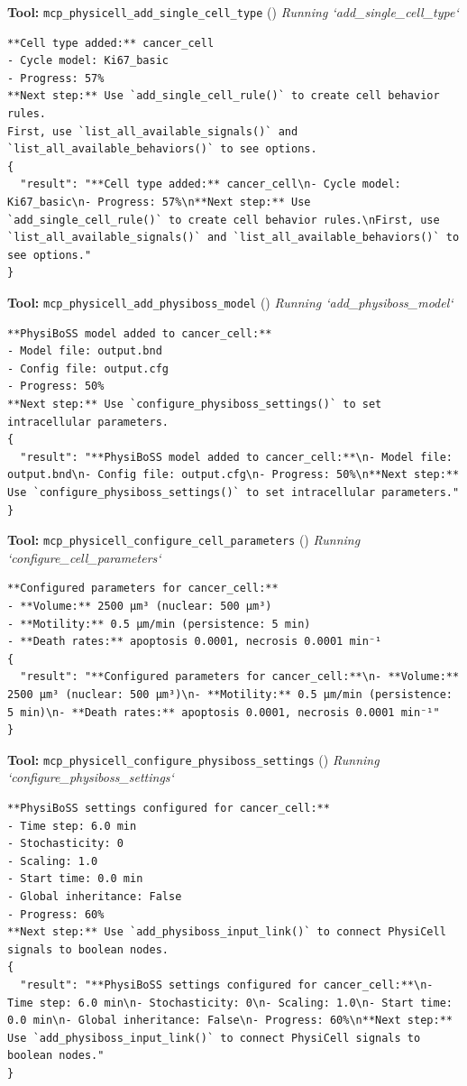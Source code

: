 \documentclass[11pt,a4paper]{article}
\begin{document}
\begin{toolokbox}
\textbf{Tool:} \texttt{mcp\_physicell\_add\_single\_cell\_type} (\checkmark)
\textit{Running `add\_single\_cell\_type`}
\begin{lstlisting}
**Cell type added:** cancer_cell
- Cycle model: Ki67_basic
- Progress: 57%
**Next step:** Use `add_single_cell_rule()` to create cell behavior rules.
First, use `list_all_available_signals()` and `list_all_available_behaviors()` to see options.
{
  "result": "**Cell type added:** cancer_cell\n- Cycle model: Ki67_basic\n- Progress: 57%\n**Next step:** Use `add_single_cell_rule()` to create cell behavior rules.\nFirst, use `list_all_available_signals()` and `list_all_available_behaviors()` to see options."
}
\end{lstlisting}
\end{toolokbox}
\begin{toolokbox}
\textbf{Tool:} \texttt{mcp\_physicell\_add\_physiboss\_model} (\checkmark)
\textit{Running `add\_physiboss\_model`}
\begin{lstlisting}
**PhysiBoSS model added to cancer_cell:**
- Model file: output.bnd
- Config file: output.cfg
- Progress: 50%
**Next step:** Use `configure_physiboss_settings()` to set intracellular parameters.
{
  "result": "**PhysiBoSS model added to cancer_cell:**\n- Model file: output.bnd\n- Config file: output.cfg\n- Progress: 50%\n**Next step:** Use `configure_physiboss_settings()` to set intracellular parameters."
}
\end{lstlisting}
\end{toolokbox}
\begin{toolokbox}
\textbf{Tool:} \texttt{mcp\_physicell\_configure\_cell\_parameters} (\checkmark)
\textit{Running `configure\_cell\_parameters`}
\begin{lstlisting}
**Configured parameters for cancer_cell:**
- **Volume:** 2500 μm³ (nuclear: 500 μm³)
- **Motility:** 0.5 μm/min (persistence: 5 min)
- **Death rates:** apoptosis 0.0001, necrosis 0.0001 min⁻¹
{
  "result": "**Configured parameters for cancer_cell:**\n- **Volume:** 2500 μm³ (nuclear: 500 μm³)\n- **Motility:** 0.5 μm/min (persistence: 5 min)\n- **Death rates:** apoptosis 0.0001, necrosis 0.0001 min⁻¹"
}
\end{lstlisting}
\end{toolokbox}
\begin{toolokbox}
\textbf{Tool:} \texttt{mcp\_physicell\_configure\_physiboss\_settings} (\checkmark)
\textit{Running `configure\_physiboss\_settings`}
\begin{lstlisting}
**PhysiBoSS settings configured for cancer_cell:**
- Time step: 6.0 min
- Stochasticity: 0
- Scaling: 1.0
- Start time: 0.0 min
- Global inheritance: False
- Progress: 60%
**Next step:** Use `add_physiboss_input_link()` to connect PhysiCell signals to boolean nodes.
{
  "result": "**PhysiBoSS settings configured for cancer_cell:**\n- Time step: 6.0 min\n- Stochasticity: 0\n- Scaling: 1.0\n- Start time: 0.0 min\n- Global inheritance: False\n- Progress: 60%\n**Next step:** Use `add_physiboss_input_link()` to connect PhysiCell signals to boolean nodes."
}
\end{lstlisting}
\end{toolokbox}
\end{document}
